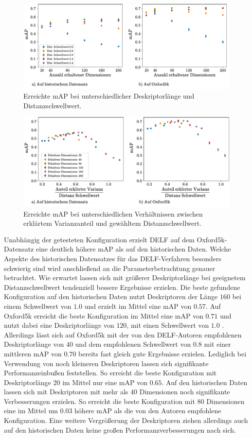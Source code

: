 \begin{figure}[h]
\includegraphics[scale=0.73]{mAp_num_dim}
\caption{Erreichte mAP bei unterschiedlicher Deskriptorlänge und Distanzschwellwert.}
\label{mAP_num_dim}
\end{figure}

\begin{figure}[h]
\includegraphics[scale=0.73]{mAp_var_dist_ratio}
\caption{Erreichte mAP bei unterschiedlichen Verhältnissen zwischen erklärtem Varianzanteil und gewähltem Distanzschwellwert.}
\label{mAP_var_dist_ratio}
\end{figure}
Unabhängig der getesteten Konfiguration erzielt DELF auf dem Oxford5k-Datensatz eine deutlich höhere mAP als auf den historischen Daten. Welche Aspekte des historischen Datensatzes für das DELF-Verfahren besonders schwierig sind wird anschließend an die Parameterbetrachtung genauer betrachtet. Wie erwartet lassen sich mit größerer Deskriptorlänge bei geeignetem Distanzschwellwert tendenziell bessere Ergebnisse erzielen. Die beste gefundene Konfiguration auf den historischen Daten nutzt Deskriptoren der Länge $160$ bei einem Schwellwert von $1.0$ und erzielt im Mittel eine mAP von $0.57$. Auf Oxford5k erreicht die beste Konfiguration im Mittel eine mAP von $0.71$ und nutzt dabei eine Deskriptorlänge von $120$, mit einen Schwellwert von $1.0$ . Allerdings lässt sich auf Oxford5k mit der von den DELF-Autoren empfohlenen Deskriptorlänge von $40$ und dem empfohlenen Schwellwert von $0.8$ mit einer mittleren mAP von $0.70$ bereits fast gleich gute Ergebnisse erzielen. Lediglich bei Verwendung von noch kleineren Deskriptoren lassen sich signifikante Performanzeinbußen feststellen. So erreicht die beste Konfiguration mit Deskriptorlänge $20$ im Mittel nur eine mAP von $0.65$. Auf den historischen Daten lassen sich mit Deskriptoren mit mehr als $40$ Dimensionen noch signifikante Verbesserungen erzielen. So erreicht die beste Konfiguration mit $80$ Dimensionen eine im Mittel um $0.03$ höhere mAP als die von den Autoren empfohlene Konfiguration. Eine weitere Vergrößerung der Deskriptoren ziehen allerdings auch auf den historischen Daten keine großen Performanzverbesserungen nach sich.
